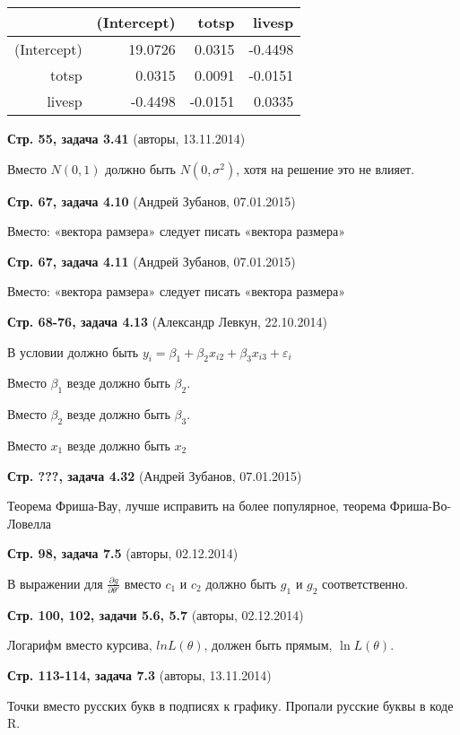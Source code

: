 \documentclass[12pt]{article} %
\newcommand{\erroronpage}[4]{\textbf{Стр. #1, #2} (#3, #4)}
\begin{document}
\begin{table}[ht]
\centering
\begin{tabular}{rrrr}
  \hline
 & (Intercept) & totsp & livesp \\
  \hline
(Intercept) & 19.0726 & 0.0315 & -0.4498 \\
  totsp & 0.0315 & 0.0091 & -0.0151 \\
  livesp & -0.4498 & -0.0151 & 0.0335 \\
   \hline
\end{tabular}
\end{table}


\erroronpage{55}{задача 3.41}{авторы}{13.11.2014}

Вместо $N(0, 1)$ должно быть $N(0, \sigma^2)$, хотя на решение это не влияет.

\erroronpage{67}{задача 4.10}{Андрей Зубанов}{07.01.2015}

Вместо: «вектора рамзера» следует писать «вектора размера»

\erroronpage{67}{задача 4.11}{Андрей Зубанов}{07.01.2015}

Вместо: «вектора рамзера» следует писать «вектора размера»

\erroronpage{68-76}{задача 4.13}{Александр Левкун}{22.10.2014}

В условии должно быть $y_i=\beta_1+\beta_2 x_{i2} + \beta_3 x_{i3}+\varepsilon_i$

Вместо $\beta_1$ везде должно быть $\beta_2$.

Вместо $\beta_2$ везде должно быть $\beta_3$.

Вместо $x_1$ везде должно быть $x_2$

\erroronpage{???}{задача 4.32}{Андрей Зубанов}{07.01.2015}

Теорема Фриша-Вау, лучше исправить на более популярное, теорема Фриша-Во-Ловелла

\erroronpage{98}{задача 7.5}{авторы}{02.12.2014}

В выражении для $\frac{\partial g}{\partial \theta'}$ вместо $c_1$ и $c_2$ должно быть $g_1$ и $g_2$ соответственно.

\erroronpage{100, 102}{задачи 5.6, 5.7}{авторы}{02.12.2014}

Логарифм вместо курсива, $ln L(\theta)$, должен быть прямым, $\ln L(\theta)$.


\erroronpage{113-114}{задача 7.3}{авторы}{13.11.2014}

Точки вместо русских букв в подписях к графику. Пропали русские буквы в коде R.
\end{document}

